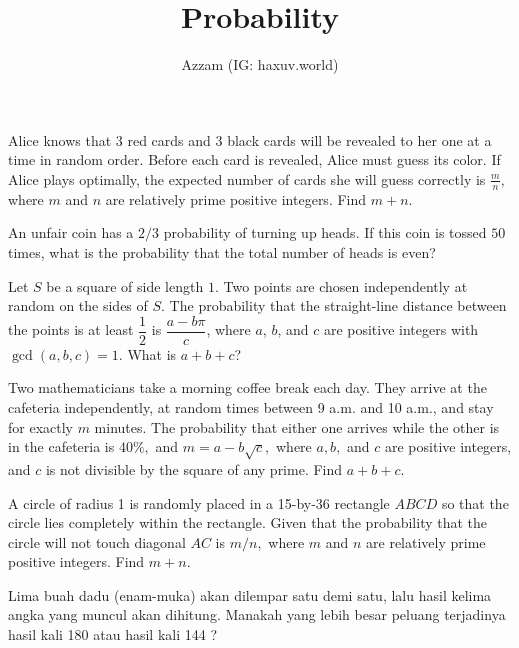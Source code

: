 \documentclass[11pt]{scrartcl}
\title{Probability}
\author{Azzam (IG: haxuv.world)}
\date{}
\begin{document}
\maketitle

\begin{soaljawab} [AIME 2023]
    Alice knows that $3$ red cards and $3$ black cards will be revealed to her one at a time in random order. Before each card is revealed, Alice must guess its color. If Alice plays optimally, the expected number of cards she will guess correctly is $\frac{m}{n},$ where $m$ and $n$ are relatively prime positive integers. Find $m+n.$
\end{soaljawab}

\begin{soaljawab} [AHSME 1992]
    An unfair coin has a $2/3$ probability of turning up heads. If this coin is tossed $50$ times, what is the probability that the total number of heads is even?
\end{soaljawab}

\begin{soaljawab}[AMC 10 2015] 
    Let $S$ be a square of side length $1$. Two points are chosen independently at random on the sides of $S$. The probability that the straight-line distance between the points is at least $\dfrac{1}{2}$ is $\dfrac{a-b\pi}{c}$, where $a$, $b$, and $c$ are positive integers with $\gcd(a,b,c)=1$. What is $a+b+c$?
\end{soaljawab}

\begin{soaljawab} [AIME 1998]
    Two mathematicians take a morning coffee break each day. They arrive at the cafeteria independently, at random times between 9 a.m. and 10 a.m., and stay for exactly $m$ minutes. The probability that either one arrives while the other is in the cafeteria is $40 \%,$ and $m = a - b\sqrt {c},$ where $a, b,$ and $c$ are positive integers, and $c$ is not divisible by the square of any prime. Find $a + b + c.$
\end{soaljawab}

\begin{soaljawab} [AIME 2004]
    A circle of radius 1 is randomly placed in a 15-by-36 rectangle $ABCD$ so that the circle lies completely within the rectangle. Given that the probability that the circle will not touch diagonal $AC$ is $m/n,$ where $m$ and $n$ are relatively prime positive integers. Find $m + n.$
\end{soaljawab}

\begin{soaljawab} 
    Lima buah dadu (enam-muka) akan dilempar satu demi satu, lalu hasil kelima angka yang muncul akan dihitung. Manakah yang lebih besar peluang terjadinya hasil kali 180 atau hasil kali 144 ? 
\end{soaljawab}
\end{document}
